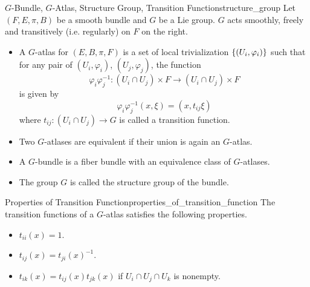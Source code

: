 \documentclass{article}
\begin{document}
\begin{definition}{$G$-Bundle, $G$-Atlas, Structure Group, Transition Function}{structure_group}
    Let $(F,E,\pi,B)$ be a smooth bundle and $G$ be a Lie group.
    $G$ acts smoothly, freely and transitively (i.e. regularly) on $F$ on the right.
    \begin{itemize}
        \item A $G$-atlas for $(E,B,\pi,F)$ is a set of local trivialization $\qty{(U_i,\varphi_i)}$ such that
        for any pair of $(U_i,\varphi_i)$, $(U_j,\varphi_j)$, the function
        \[ \varphi_i \varphi_j^{-1}: (U_i \cap U_j)\times F \rightarrow (U_i \cap U_j)\times F \]
        is given by
        \[ \varphi_i \varphi_j^{-1}(x, \xi) = (x, t_{ij}\xi) \]
        where $t_{ij}: (U_i\cap U_j) \rightarrow G$ is called a transition function.
        \item Two $G$-atlases are equivalent if their union is again an $G$-atlas.
        \item A $G$-bundle is a fiber bundle with an equivalence class of $G$-atlases.
        \item The group $G$ is called the structure group of the bundle.
    \end{itemize}
\end{definition}

\begin{proposition}{Properties of Transition Function}{properties_of_transition_function}
    The transition functions of a $G$-atlas satisfies the following properties.
    \begin{itemize}
        \item $t_{ii}(x) = 1$.
        \item $t_{ij}(x) = t_{ji}(x)^{-1}$.
        \item $t_{ik}(x) = t_{ij}(x) t_{jk}(x)$ if $U_i \cap U_j \cap U_k$ is nonempty.
    \end{itemize}
\end{proposition}
\end{document}
